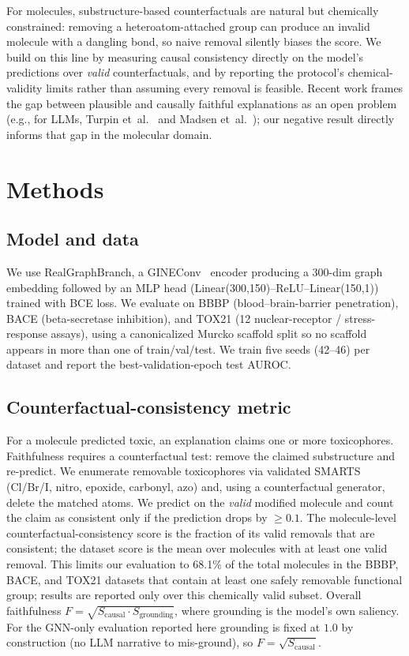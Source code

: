 \documentclass[a4paper,fleqn]{cas-dc}
\begin{document}
For molecules, substructure-based counterfactuals are natural but chemically constrained: removing a heteroatom-attached group can produce an invalid molecule with a dangling bond, so naive removal silently biases the score. We build on this line by measuring causal consistency directly on the model's predictions over \emph{valid} counterfactuals, and by reporting the protocol's chemical-validity limits rather than assuming every removal is feasible. Recent work frames the gap between plausible and causally faithful explanations as an open problem (e.g., for LLMs, Turpin et~al.~\cite{turpin2023language} and Madsen et~al.~\cite{madsen2024selfexplanations}); our negative result directly informs that gap in the molecular domain.

\section{Methods}
\subsection{Model and data}
We use RealGraphBranch, a GINEConv~\cite{xu2019powerful} encoder producing a 300-dim graph embedding followed by an MLP head (Linear(300,150)--ReLU--Linear(150,1)) trained with BCE loss. We evaluate on BBBP (blood--brain-barrier penetration), BACE (beta-secretase inhibition), and TOX21 (12 nuclear-receptor / stress-response assays), using a canonicalized Murcko scaffold split so no scaffold appears in more than one of train/val/test. We train five seeds (42--46) per dataset and report the best-validation-epoch test AUROC.

\subsection{Counterfactual-consistency metric}
\label{sec:metric}
For a molecule predicted toxic, an explanation claims one or more toxicophores. Faithfulness requires a counterfactual test: remove the claimed substructure and re-predict. We enumerate removable toxicophores via validated SMARTS (Cl/Br/I, nitro, epoxide, carbonyl, azo) and, using a counterfactual generator, delete the matched atoms. We predict on the \emph{valid} modified molecule and count the claim as consistent only if the prediction drops by $\geq 0.1$. The molecule-level counterfactual-consistency score is the fraction of its valid removals that are consistent; the dataset score is the mean over molecules with at least one valid removal. This limits our evaluation to 68.1\% of the total molecules in the BBBP, BACE, and TOX21 datasets that contain at least one safely removable functional group; results are reported only over this chemically valid subset. Overall faithfulness $F = \sqrt{S_{\text{causal}} \cdot S_{\text{grounding}}}$, where grounding is the model's own saliency. For the GNN-only evaluation reported here grounding is fixed at $1.0$ by construction (no LLM narrative to mis-ground), so $F = \sqrt{S_{\text{causal}}}$.
\end{document}
